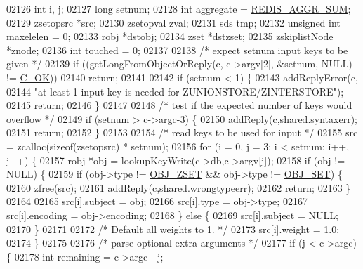 \begin{DoxyCode}
02126     \textcolor{keywordtype}{int} i, j;
02127     \textcolor{keywordtype}{long} setnum;
02128     \textcolor{keywordtype}{int} aggregate = \hyperlink{t__zset_8c_a68af64a03a67d45bee92a8713f640ce8}{REDIS\_AGGR\_SUM};
02129     zsetopsrc *src;
02130     zsetopval zval;
02131     sds tmp;
02132     \textcolor{keywordtype}{unsigned} \textcolor{keywordtype}{int} maxelelen = 0;
02133     robj *dstobj;
02134     zset *dstzset;
02135     zskiplistNode *znode;
02136     \textcolor{keywordtype}{int} touched = 0;
02137 
02138     \textcolor{comment}{/* expect setnum input keys to be given */}
02139     \textcolor{keywordflow}{if} ((getLongFromObjectOrReply(c, c->argv[2], &setnum, NULL) != \hyperlink{server_8h_a303769ef1065076e68731584e758d3e1}{C\_OK}))
02140         \textcolor{keywordflow}{return};
02141 
02142     \textcolor{keywordflow}{if} (setnum < 1) \{
02143         addReplyError(c,
02144             \textcolor{stringliteral}{"at least 1 input key is needed for ZUNIONSTORE/ZINTERSTORE"});
02145         \textcolor{keywordflow}{return};
02146     \}
02147 
02148     \textcolor{comment}{/* test if the expected number of keys would overflow */}
02149     \textcolor{keywordflow}{if} (setnum > c->argc-3) \{
02150         addReply(c,shared.syntaxerr);
02151         \textcolor{keywordflow}{return};
02152     \}
02153 
02154     \textcolor{comment}{/* read keys to be used for input */}
02155     src = zcalloc(\textcolor{keyword}{sizeof}(zsetopsrc) * setnum);
02156     \textcolor{keywordflow}{for} (i = 0, j = 3; i < setnum; i++, j++) \{
02157         robj *obj = lookupKeyWrite(c->db,c->argv[j]);
02158         \textcolor{keywordflow}{if} (obj != NULL) \{
02159             \textcolor{keywordflow}{if} (obj->type != \hyperlink{server_8h_a8c356422ddbc03bd77694880a30a1953}{OBJ\_ZSET} && obj->type != \hyperlink{server_8h_a8d179375a4aac33d3fa7aa80c8ccc75f}{OBJ\_SET}) \{
02160                 zfree(src);
02161                 addReply(c,shared.wrongtypeerr);
02162                 \textcolor{keywordflow}{return};
02163             \}
02164 
02165             src[i].subject = obj;
02166             src[i].type = obj->type;
02167             src[i].encoding = obj->encoding;
02168         \} \textcolor{keywordflow}{else} \{
02169             src[i].subject = NULL;
02170         \}
02171 
02172         \textcolor{comment}{/* Default all weights to 1. */}
02173         src[i].weight = 1.0;
02174     \}
02175 
02176     \textcolor{comment}{/* parse optional extra arguments */}
02177     \textcolor{keywordflow}{if} (j < c->argc) \{
02178         \textcolor{keywordtype}{int} remaining = c->argc - j;

\end{DoxyCode}
